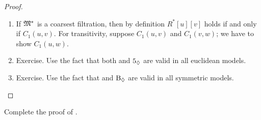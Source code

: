 \documentclass[../../../include/open-logic-section]{subfiles}
\begin{document}
\begin{proof}
\begin{enumerate}
  \item If $\mathfrak M^*$ is a coarsest filtration, then by definition
    $R^*[u][v]$ holds if and only if $C_1(u,v)$. For transitivity,
    suppose $C_1(u,v)$ and $C_1(v,w)$; we have to show
    $C_1(u,w)$. 
  \item Exercise. Use the fact that both  and $\mathrm{5_\Diamond}$
    are valid in all euclidean models.
  \item Exercise. Use the fact that  and $\mathrm{B_\Diamond}$ are
    valid in all symmetric models.
\end{enumerate}
\end{proof}

\begin{prob}
  Complete the proof of .
\end{prob}
\end{document}
